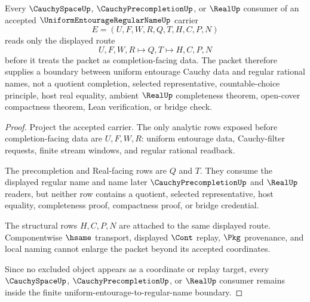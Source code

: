 \begin{theorem}
\label{thm:uniform-entourage-regular-name-cauchyspace-boundary}
Every $\CauchySpaceUp$, $\CauchyPrecompletionUp$, or $\RealUp$ consumer of an accepted $\UniformEntourageRegularNameUp$ carrier
$$
E=(U,F,W,R,Q,T,H,C,P,N)
$$
reads only the displayed route
$$
U,F,W,R \longmapsto Q,T \longmapsto H,C,P,N
$$
before it treats the packet as completion-facing data. The packet therefore supplies a boundary between uniform entourage Cauchy data and regular rational names, not a quotient completion, selected representative, countable-choice principle, host real equality, ambient $\RealUp$ completeness theorem, open-cover compactness theorem, Lean verification, or bridge check.
\end{theorem}
\begin{proof}
Project the accepted carrier. The only analytic rows exposed before completion-facing data are $U,F,W,R$: uniform entourage data, Cauchy-filter requests, finite stream windows, and regular rational readback.

The precompletion and Real-facing rows are $Q$ and $T$. They consume the displayed regular name and name later $\CauchyPrecompletionUp$ and $\RealUp$ readers, but neither row contains a quotient, selected representative, host equality, completeness proof, compactness proof, or bridge credential.

The structural rows $H,C,P,N$ are attached to the same displayed route. Componentwise $\hsame$ transport, displayed $\Cont$ replay, $\Pkg$ provenance, and local naming cannot enlarge the packet beyond its accepted coordinates.

Since no excluded object appears as a coordinate or replay target, every $\CauchySpaceUp$, $\CauchyPrecompletionUp$, or $\RealUp$ consumer remains inside the finite uniform-entourage-to-regular-name boundary.
\end{proof}


